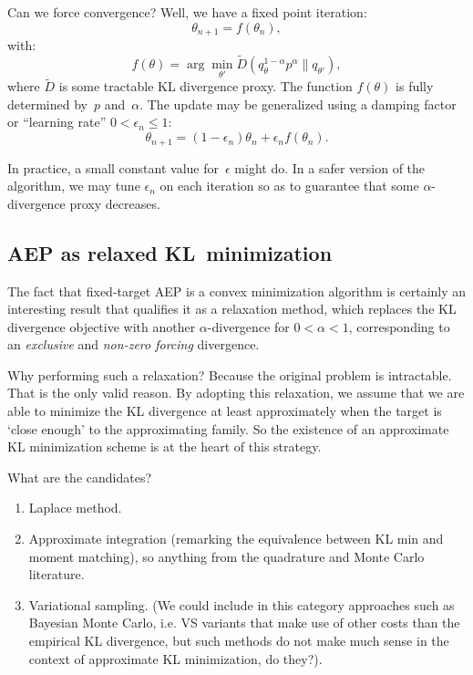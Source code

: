 \documentclass{article}
\begin{document}
Can we force convergence? Well, we have a fixed point iteration:
$$
\theta_{n+1} = f(\theta_n),
$$
with:
$$
f(\theta) = \arg\min_{\theta'} \tilde{D}(q_\theta^{1-\alpha}p^\alpha\|q_{\theta'}),
$$
where $\tilde{D}$ is some tractable KL divergence proxy. The function $f(\theta)$ is fully determined by~$p$ and~$\alpha$. The update may be generalized using a damping factor or ``learning rate'' $0<\epsilon_n\leq 1$:
$$
\theta_{n+1} = (1-\epsilon_n)\theta_n + \epsilon_n f(\theta_n).
$$


In practice, a small constant value for~$\epsilon$ might do. In a safer version of the algorithm, we may tune $\epsilon_n$ on each iteration so as to guarantee that some $\alpha$-divergence proxy decreases.


\subsection{AEP as relaxed KL~minimization}

The fact that fixed-target AEP is a convex minimization algorithm is certainly an interesting result that qualifies it as a relaxation method, which replaces the KL divergence objective with another $\alpha$-divergence for $0<\alpha<1$, corresponding to an {\em exclusive} and {\em non-zero forcing} divergence. 

Why performing such a relaxation? Because the original problem is intractable. That is the only valid reason. By adopting this relaxation, we assume that we are able to minimize the KL divergence at least approximately when the target is `close enough' to the approximating family. So the existence of an approximate KL minimization scheme is at the heart of this strategy.

What are the candidates? 
\begin{enumerate}
\item Laplace method.
\item Approximate integration (remarking the equivalence between KL min and moment matching), so anything from the quadrature and Monte Carlo literature.
\item Variational sampling. (We could include in this category approaches such as Bayesian Monte Carlo, i.e. VS variants that make use of other costs than the empirical KL divergence, but such methods do not make much sense in the context of approximate KL minimization, do they?). 
\end{enumerate}
\end{document}
